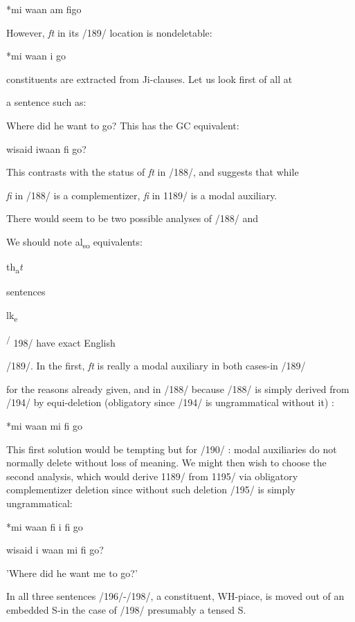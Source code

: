 \ea\label{ex:192}
 *mi waan am figo
\glt
\z

However, \textit{ft} in its /189/ location is nondeletable:

\ea\label{ex:193}
 *mi waan i go
\glt
\z


constituents are extracted from Ji-clauses. Let us look first of all at

a sentence such as:

\ea\label{ex:196}
 Where did he want to go? This has the GC equivalent:
\glt
\z

\ea\label{ex:197}
 wisaid iwaan fi go?
\glt
\z

This contrasts with the status of \textit{ft} in /188/, and suggests that while

\textit{fi} in /188/ is a complementizer, \textit{fi} in 1189/ is a modal auxiliary.

There would seem to be two possible analyses of /188/ and

We should note al\textsubscript{so}\textsubscript{ }equivalents:

th\textsubscript{a}\textit{t}

sentences

l{\textquotedbl}k\textsubscript{e}

\textsuperscript{/} 198/ have exact English

/189/. In the first, \textit{ft} is really a modal auxiliary in both cases-in /189/

for the reasons already given, and in /188/ because /188/ is simply derived from /194/ by equi{}-deletion (obligatory since /194/ is un\-grammatical without it) :

\ea\label{ex:194}
 *mi waan mi fi go
\glt
\z

This first solution would be tempting but for /190/ : modal auxiliaries do not normally delete without loss of meaning. We might then wish to choose the second analysis, which would derive 1189/ from 1195/ via obligatory complementizer deletion since without such deletion /195/ is simply ungrammatical:

\ea\label{ex:195}
 *mi waan fi i fi go
\glt
\z

\ea\label{ex:198}
 wisaid i waan mi fi go?
\glt
\z

'Where did he want me to go?'

In all three sentences /196/-/198/, a constituent, WH-piace, is moved out of an embedded S-in the case of /198/ presumably a tensed S.

